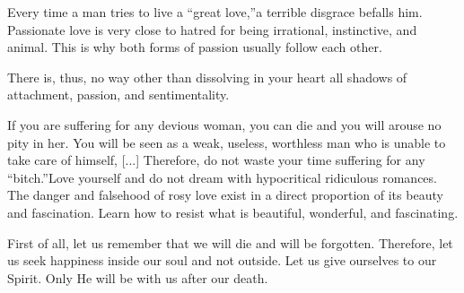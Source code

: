 \par Every time a man tries to live a \enquote{great love,}\footnotemark[5] a terrible disgrace befalls him. Passionate love is very close to hatred for being irrational, instinctive, and animal. This is why both forms of passion usually follow each other.\footnotemark[6]



\par There is, thus, no way other than dissolving in your heart all shadows of attachment, passion, and sentimentality\footnotemark[7].


\par If you are suffering for any devious woman, you can die and you will arouse no pity in her. You will be seen as a weak, useless, worthless man who is unable to take care of himself, [...] Therefore, do not waste your time suffering for any \enquote{bitch.}\footnotemark[8] Love yourself and do not dream with hypocritical ridiculous romances. The danger and falsehood of rosy love exist in a direct proportion of its beauty and fascination. Learn how to resist what is beautiful, wonderful, and fascinating.


\par First of all, let us remember that we will die and will be forgotten. Therefore, let us seek happiness inside our soul and not outside. Let us give ourselves to our Spirit. Only He will be with us after our death.

